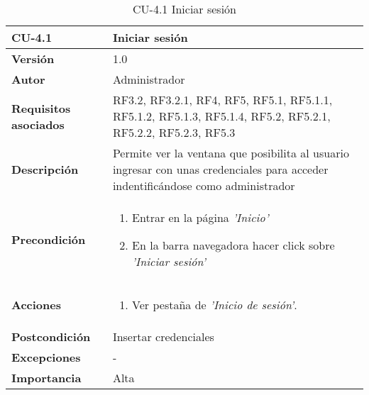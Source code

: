 \begin{table}[h!]
	\centering
	\begin{tabularx}{\linewidth}{ p{} p{} }
		\toprule
		\textbf{CU-4.1}    & \textbf{Iniciar sesión}\\
		\toprule
		\textbf{Versión}              & 1.0    \\
		\textbf{Autor}                & Administrador \\
		\textbf{Requisitos asociados} & RF3.2, RF3.2.1, RF4, RF5, RF5.1, RF5.1.1, RF5.1.2, RF5.1.3, RF5.1.4, RF5.2, RF5.2.1, RF5.2.2, RF5.2.3, RF5.3\\
		\textbf{Descripción}          & Permite ver la ventana que posibilita al usuario ingresar con unas credenciales para acceder indentificándose como administrador\\
        \textbf{Precondición}         &  
  		\begin{enumerate}
			\def\labelenumi{\arabic{enumi}.}
			\tightlist
			\item Entrar en la página \textit{'Inicio'}
			\item En la barra navegadora hacer click sobre \textit{'Iniciar sesión'}
		\end{enumerate}\\
		\textbf{Acciones}             &
		\begin{enumerate}
			\def\labelenumi{\arabic{enumi}.}
			\tightlist
			\item Ver pestaña de \textit{'Inicio de sesión'}.
		\end{enumerate}\\
		\textbf{Postcondición}     &   Insertar credenciales \\
		\textbf{Excepciones}          & - \\
		\textbf{Importancia}          & Alta \\
		\bottomrule
	\end{tabularx}
	\caption{CU-4.1 Iniciar sesión}
\end{table}

